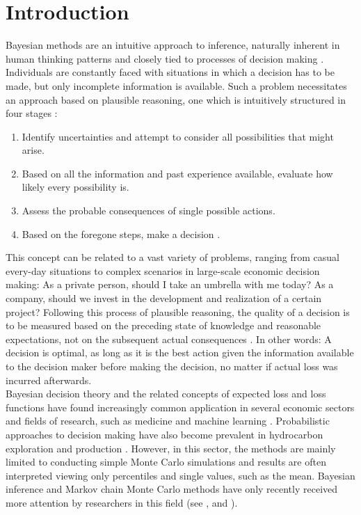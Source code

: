 \chapter{Introduction} \label{chap:intro}
Bayesian methods are an intuitive approach to inference, naturally inherent in human thinking patterns and closely tied to processes of decision making \citep{berger2013stat, davidson2015, jaynes1986bayesian}. Individuals are constantly faced with situations in which a decision has to be made, but only incomplete information is available. Such a problem necessitates an approach based on plausible reasoning, one which is intuitively structured in four stages \citep{jaynes1986bayesian}:
\begin{enumerate}
	\item Identify uncertainties and attempt to consider all possibilities that might arise.
	\item Based on all the information and past experience available, evaluate how likely every possibility is.
	\item Assess the probable consequences of single possible actions.
	\item Based on the foregone steps, make a decision \citep{jaynes1986bayesian}.
\end{enumerate}
This concept can be related to a vast variety of problems, ranging from casual every-day situations to complex scenarios in large-scale economic decision making: As a private person, should I take an umbrella with me today? As a company, should we invest in the development and realization of a certain project? Following this process of plausible reasoning, the quality of a decision is to be measured based on the preceding state of knowledge and reasonable expectations, not on the subsequent actual consequences \citep{jaynes1986bayesian}. In other words: A decision is optimal, as long as it is the best action given the information available to the decision maker before making the decision, no matter if actual loss was incurred afterwards.\\
Bayesian decision theory and the related concepts of expected loss and loss functions have found increasingly common application in several economic sectors and fields of research, such as medicine \citep{ashby2000evidence, ashby2006bayesian, moye2006statistical} and machine learning \citep{barber2012bayesian, theodoridis2015machine}. Probabilistic approaches to decision making have also become prevalent in hydrocarbon exploration and production \citep{murtha1997monte, mudford2000valuing,bratvold2010making}. However, in this sector, the methods are mainly limited to conducting simple Monte Carlo simulations and results are often interpreted viewing only percentiles and single values, such as the mean. Bayesian inference and Markov chain Monte Carlo methods have only recently received more attention by researchers in this field (see \citet{wadsley2005markov}, \citet{ma2006multistage} and \citet{liu2010continuous}).\\
